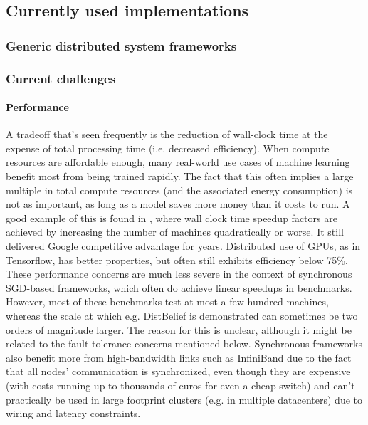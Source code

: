 \subsection{Currently used implementations}
\subsubsection{Generic distributed system frameworks}


\subsubsection{Current challenges}

\paragraph{Performance}

A tradeoff that’s seen frequently is the reduction of wall-clock time at the expense of total processing time (i.e. decreased efficiency). When compute resources are affordable enough, many real-world use cases of machine learning benefit most from being trained rapidly. The fact that this often implies a large multiple in total compute resources (and the associated energy consumption) is not as important, as long as a model saves more money than it costs to run.  A good example of this is found in \citet{DistBelief2012}, where wall clock time speedup factors are achieved by increasing the number of machines quadratically or worse. It still delivered Google competitive advantage for years. Distributed use of GPUs, as in Tensorflow, has better properties, but often still exhibits efficiency below 75\%.
These performance concerns are much less severe in the context of synchronous SGD-based frameworks, which often do achieve linear speedups in benchmarks. However, most of these benchmarks test at most a few hundred machines, whereas the scale at which e.g. DistBelief is demonstrated can sometimes be two orders of magnitude larger. The reason for this is unclear, although it might be related to the fault tolerance concerns mentioned below. Synchronous frameworks also benefit more from high-bandwidth links such as InfiniBand due to the fact that all nodes' communication is synchronized, even though they are expensive (with costs running up to thousands of euros for even a cheap switch) and can't practically be used in large footprint clusters (e.g. in multiple datacenters) due to wiring and latency constraints.

